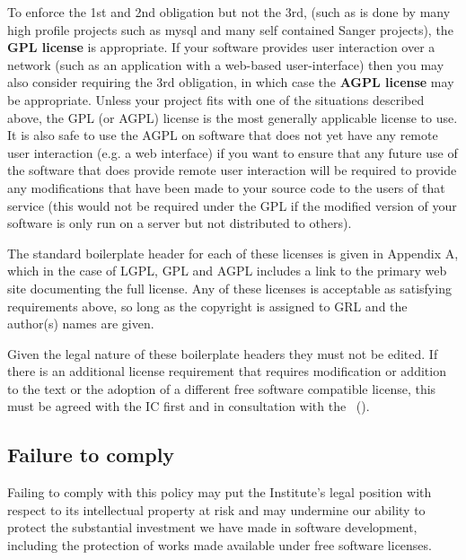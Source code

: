 \documentclass[10pt,a4paper]{article}
\begin{document}
To enforce the 1st and 2nd obligation but not the 3rd, (such as is done by many high 
profile projects such as mysql and many self contained Sanger projects), the \textbf{GPL 
license} is appropriate. If your software provides user interaction over a network (such 
as an application with a web-based user-interface) then you may also consider requiring 
the 3rd obligation, in which case the \textbf{AGPL license} may be appropriate. Unless your 
project fits with one of the situations described above, the GPL (or AGPL) license is the 
most generally applicable license to use. It is also safe to use the AGPL on software that 
does not yet have any remote user interaction (e.g. a web interface) if you want to 
ensure that any future use of the software that does provide remote user interaction will 
be required to provide any modifications that have been made to your source code to 
the users of that service (this would not be required under the GPL if the modified 
version of your software is only run on a server but not distributed to others). 
 
The standard boilerplate header for each of these licenses is given in Appendix A, 
which in the case of LGPL, GPL and AGPL includes a link to the primary web site 
documenting the full license. Any of these licenses is acceptable as satisfying 
requirements above, so long as the copyright is assigned to GRL 
and the author(s) names are given.

Given the legal nature of these boilerplate headers they must not be edited. If there is an 
additional license requirement that requires modification or addition to the text or the 
adoption of a different free software compatible license, this must be agreed with the 
IC first and in consultation with the \exectitle\ (\execperson).



\subsection{Failure to comply}
\label{section:policy.copyright.failure}
\par Failing to comply with this policy may put the Institute's legal position with respect 
to its intellectual property at risk and may undermine our ability to protect the 
substantial investment we have made in software development, including the protection 
of works made available under free software licenses. 
\end{document}
